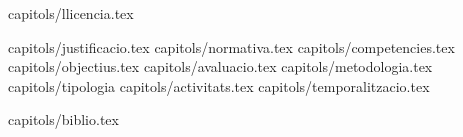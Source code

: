 \documentclass[a4paper,12pt,oneside]{book}  {preamble/preamble}
\begin{document}
\frontmatter
\maketitle

 {capitols/llicencia.tex}
\tableofcontents

\mainmatter
 {capitols/justificacio.tex}
 {capitols/normativa.tex}
 {capitols/competencies.tex}
 {capitols/objectius.tex}
 {capitols/avaluacio.tex}
 {capitols/metodologia.tex}
 {capitols/tipologia}
 {capitols/activitats.tex}
 {capitols/temporalitzacio.tex}

\backmatter
 {capitols/biblio.tex}
\end{document}
